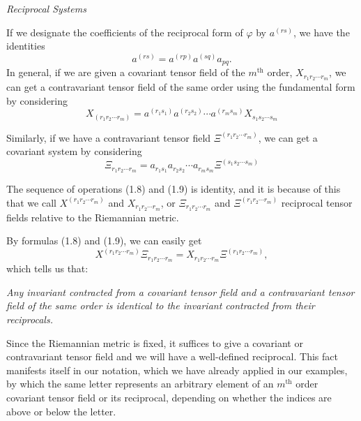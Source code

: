 \documentclass{book}
\begin{document}
\begin{center}
	\emph{Reciprocal Systems}
\end{center}

If we designate the coefficients of the reciprocal form of $\varphi$ by $a^{(rs)}$, we have the identities
$$a^{(rs)}=a^{(rp)}a^{(sq)}a_{pq}.$$
In general, if we are given a covariant tensor field of the $m^{\text{th}}$ order, $X_{r_1r_2\cdots r_m}$, we can get a contravariant tensor field of the same order using the fundamental form by considering
\begin{equation}
	X_{(r_1r_2\cdots r_m)}=a^{(r_1s_1)}a^{(r_2s_2)}\cdots a^{(r_ms_m)}X_{s_1s_2\cdots s_m}
\end{equation}

Similarly, if we have a contravariant tensor field $\Xi^{(r_1r_2\cdots r_m)}$, we can get a covariant system by considering
\begin{equation}
	\Xi_{r_1r_2\cdots r_m}=a_{r_1s_1}a_{r_2s_2}\cdots a_{r_ms_m}\Xi^{(s_1s_2\cdots s_m)}
\end{equation}

The sequence of operations (1.8) and (1.9) is identity, and it is because of this that we call $X^{(r_1r_2\cdots r_m)}$ and $X_{r_1r_2\cdots r_m}$, or $\Xi_{r_1r_2\cdots r_m}$ and $\Xi^{(r_1r_2\cdots r_m)}$ reciprocal tensor fields relative to the Riemannian metric. 

By formulas (1.8) and (1.9), we can easily get
\begin{equation}
X^{(r_1r_2\cdots r_m)}\Xi_{r_1r_2\cdots r_m}=X_{r_1r_2\cdots r_m}\Xi^{(r_1r_2\cdots r_m)},
\end{equation}
which tells us that:

\emph{Any invariant contracted from a covariant tensor field and a contravariant tensor field of the same order is identical to the invariant contracted from their reciprocals.}

Since the Riemannian metric is fixed, it suffices to give a covariant or contravariant tensor field and we will have a well-defined reciprocal. This fact manifests itself in our notation, which we have already applied in our examples, by which the same letter represents an arbitrary element of an $m^{\text{th}}$ order covariant tensor field or its reciprocal, depending on whether the indices are above or below the letter.
\end{document}
